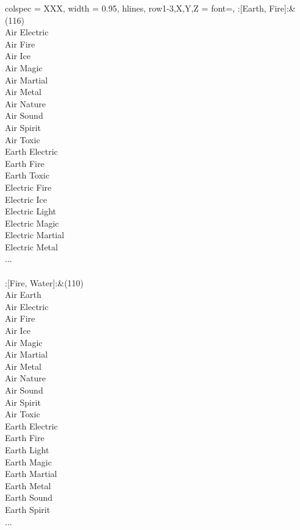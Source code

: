 \begin{longtblr}[
	caption = {2v2 Defending Weak},
	label = {2v2-Defending-Weak},
]{
	colspec = {XXX}, width = 0.95\linewidth,
	hlines,
	row{1-3,X,Y,Z} = {font=\bfseries},
}
	:[Earth, Fire]:&{(116)\\
	Air Electric \\
	Air Fire \\
	Air Ice \\
	Air Magic \\
	Air Martial \\
	Air Metal \\
	Air Nature \\
	Air Sound \\
	Air Spirit \\
	Air Toxic \\
	Earth Electric \\
	Earth Fire \\
	Earth Toxic \\
	Electric Fire \\
	Electric Ice \\
	Electric Light \\
	Electric Magic \\
	Electric Martial \\
	Electric Metal \\
	...\\
	}\\

	:[Fire, Water]:&{(110)\\
	Air Earth \\
	Air Electric \\
	Air Fire \\
	Air Ice \\
	Air Magic \\
	Air Martial \\
	Air Metal \\
	Air Nature \\
	Air Sound \\
	Air Spirit \\
	Air Toxic \\
	Earth Electric \\
	Earth Fire \\
	Earth Light \\
	Earth Magic \\
	Earth Martial \\
	Earth Metal \\
	Earth Sound \\
	Earth Spirit \\
	...\\
	}\\


\end{longtblr}
